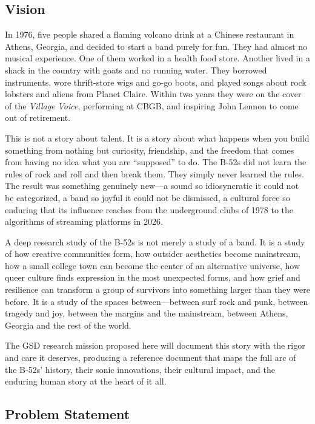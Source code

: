 \documentclass[11pt,letterpaper]{article}
\begin{document}
\subsection{Vision}

In 1976, five people shared a flaming volcano drink at a Chinese restaurant in Athens, Georgia, and decided to start a band purely for fun. They had almost no musical experience. One of them worked in a health food store. Another lived in a shack in the country with goats and no running water. They borrowed instruments, wore thrift-store wigs and go-go boots, and played songs about rock lobsters and aliens from Planet Claire. Within two years they were on the cover of the \textit{Village Voice}, performing at CBGB, and inspiring John Lennon to come out of retirement.

This is not a story about talent. It is a story about what happens when you build something from nothing but curiosity, friendship, and the freedom that comes from having no idea what you are ``supposed'' to do. The B-52s did not learn the rules of rock and roll and then break them. They simply never learned the rules. The result was something genuinely new---a sound so idiosyncratic it could not be categorized, a band so joyful it could not be dismissed, a cultural force so enduring that its influence reaches from the underground clubs of 1978 to the algorithms of streaming platforms in 2026.

A deep research study of the B-52s is not merely a study of a band. It is a study of how creative communities form, how outsider aesthetics become mainstream, how a small college town can become the center of an alternative universe, how queer culture finds expression in the most unexpected forms, and how grief and resilience can transform a group of survivors into something larger than they were before. It is a study of the spaces between---between surf rock and punk, between tragedy and joy, between the margins and the mainstream, between Athens, Georgia and the rest of the world.

The GSD research mission proposed here will document this story with the rigor and care it deserves, producing a reference document that maps the full arc of the B-52s' history, their sonic innovations, their cultural impact, and the enduring human story at the heart of it all.

\subsection{Problem Statement}
\end{document}

